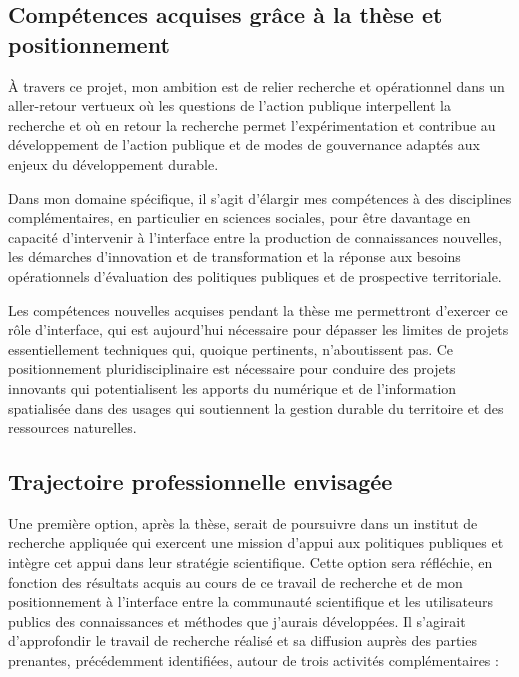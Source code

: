 \subsection
{Compétences acquises grâce à la thèse et positionnement}

À travers ce projet, mon ambition est de relier recherche et opérationnel dans
un aller-retour vertueux où les questions de l’action publique interpellent la
recherche et où en retour la recherche permet l’expérimentation et contribue
au développement de l’action publique et de modes de gouvernance adaptés aux
enjeux du développement durable.

Dans mon domaine spécifique, il s'agit d'élargir mes compétences à des
disciplines complémentaires, en particulier en sciences sociales, pour être
davantage en capacité d'intervenir à l'interface entre la production de
connaissances nouvelles, les démarches d'innovation et de transformation et la
réponse aux besoins opérationnels d'évaluation des politiques publiques et de
prospective territoriale.

Les compétences nouvelles acquises pendant la thèse me permettront d'exercer
ce rôle d'interface, qui est aujourd'hui nécessaire pour dépasser les limites
de projets essentiellement techniques qui, quoique pertinents, n'aboutissent
pas. Ce positionnement pluridisciplinaire est nécessaire pour conduire des
projets innovants qui potentialisent les apports du numérique et de
l'information spatialisée dans des usages qui soutiennent la gestion durable
du territoire et des ressources naturelles.

\subsection
{Trajectoire professionnelle envisagée}

Une première option, après la thèse, serait de poursuivre dans un institut de
recherche appliquée qui exercent une mission d’appui aux politiques publiques
et intègre cet appui dans leur stratégie scientifique. Cette option sera
réfléchie, en fonction des résultats acquis au cours de ce travail de
recherche et de mon positionnement à l’interface entre la communauté
scientifique et les utilisateurs publics des connaissances et méthodes que
j’aurais développées. Il s’agirait d’approfondir le travail de recherche
réalisé et sa diffusion auprès des parties prenantes, précédemment
identifiées, autour de trois activités complémentaires :

\startitemize

